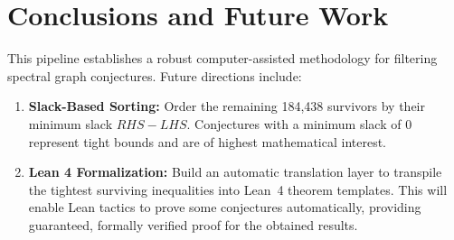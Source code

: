 \documentclass[11pt,letterpaper]{article}
\begin{document}
\section{Conclusions and Future Work}
This pipeline establishes a robust computer-assisted methodology for filtering spectral graph conjectures. Future directions include:
\begin{enumerate}
    \item \textbf{Slack-Based Sorting:} Order the remaining 184,438 survivors by their minimum slack $RHS - LHS$. Conjectures with a minimum slack of 0 represent tight bounds and are of highest mathematical interest.
    \item \textbf{Lean 4 Formalization:} Build an automatic translation layer to transpile the tightest surviving inequalities into Lean~4 theorem templates. This will enable Lean tactics to prove some conjectures automatically, providing guaranteed, formally verified proof for the obtained results.
\end{enumerate}
\end{document}
